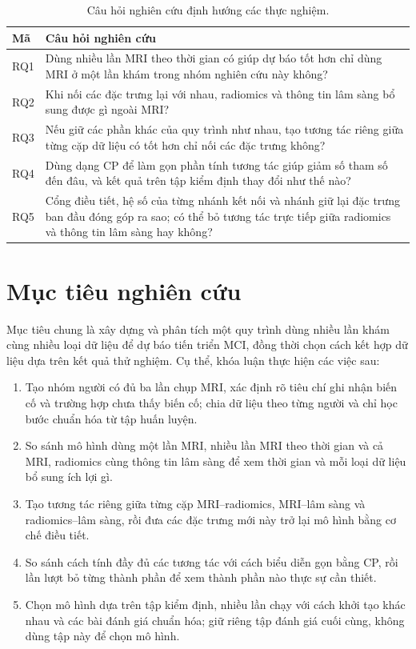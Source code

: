 \begin{table}[htbp]
\centering
\caption{Câu hỏi nghiên cứu định hướng các thực nghiệm.}
\label{tab:rq}
\begin{tabularx}{\textwidth}{C{1.0cm}Y}
\toprule
\textbf{Mã} & \textbf{Câu hỏi nghiên cứu} \\
\midrule
RQ1 & Dùng nhiều lần MRI theo thời gian có giúp dự báo tốt hơn chỉ dùng MRI ở một lần khám trong nhóm nghiên cứu này không? \\
RQ2 & Khi nối các đặc trưng lại với nhau, radiomics và thông tin lâm sàng bổ sung được gì ngoài MRI? \\
RQ3 & Nếu giữ các phần khác của quy trình như nhau, tạo tương tác riêng giữa từng cặp dữ liệu có tốt hơn chỉ nối các đặc trưng không? \\
RQ4 & Dùng dạng CP để làm gọn phần tính tương tác giúp giảm số tham số đến đâu, và kết quả trên tập kiểm định thay đổi như thế nào? \\
RQ5 & Cổng điều tiết, hệ số của từng nhánh kết nối và nhánh giữ lại đặc trưng ban đầu đóng góp ra sao; có thể bỏ tương tác trực tiếp giữa radiomics và thông tin lâm sàng hay không? \\
\bottomrule
\end{tabularx}
\end{table}

\FloatBarrier
\section{Mục tiêu nghiên cứu}
Mục tiêu chung là xây dựng và phân tích một quy trình dùng nhiều lần khám cùng nhiều loại dữ liệu để dự báo tiến triển MCI, đồng thời chọn cách kết hợp dữ liệu dựa trên kết quả thử nghiệm. Cụ thể, khóa luận thực hiện các việc sau:
\begin{enumerate}
  \item Tạo nhóm người có đủ ba lần chụp MRI, xác định rõ tiêu chí ghi nhận biến cố và trường hợp chưa thấy biến cố; chia dữ liệu theo từng người và chỉ học bước chuẩn hóa từ tập huấn luyện.
  \item So sánh mô hình dùng một lần MRI, nhiều lần MRI theo thời gian và cả MRI, radiomics cùng thông tin lâm sàng để xem thời gian và mỗi loại dữ liệu bổ sung ích lợi gì.
  \item Tạo tương tác riêng giữa từng cặp MRI--radiomics, MRI--lâm sàng và radiomics--lâm sàng, rồi đưa các đặc trưng mới này trở lại mô hình bằng cơ chế điều tiết.
  \item So sánh cách tính đầy đủ các tương tác với cách biểu diễn gọn bằng CP, rồi lần lượt bỏ từng thành phần để xem thành phần nào thực sự cần thiết.
  \item Chọn mô hình dựa trên tập kiểm định, nhiều lần chạy với cách khởi tạo khác nhau và các bài đánh giá chuẩn hóa; giữ riêng tập đánh giá cuối cùng, không dùng tập này để chọn mô hình.
\end{enumerate}

